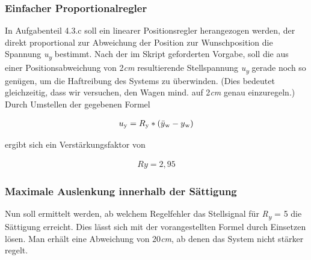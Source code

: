 \documentclass[10pt]{scrartcl}
\begin{document}
\subsubsection {Einfacher Proportionalregler}
In Aufgabenteil 4.3.c soll ein linearer Positionsregler herangezogen werden, der direkt proportional zur Abweichung der Position zur Wunschposition die Spannung \textit{ u\textsubscript{y}} bestimmt.
Nach der im Skript geforderten Vorgabe, soll die aus einer Positionsabweichung von 2\textit{cm} resultierende Stellspannung \textit{ u\textsubscript{y}} gerade noch so genügen, um die Haftreibung des Systems zu überwinden. (Dies bedeutet gleichzeitig, dass wir versuchen, den Wagen mind. auf 2\textit{cm} genau einzuregeln.) 
Durch Umstellen der gegebenen Formel 

\begin {align}
u\textsubscript{y}=R\textsubscript{y}*(\bar{y}\textsubscript{w}-y\textsubscript{w}) 
\end{align}

ergibt sich ein Verstärkungsfaktor von 

\begin {align}
Ry=2,95
\end{align}


\subsubsection {Maximale Auslenkung innerhalb der Sättigung}

Nun soll ermittelt werden, ab welchem Regelfehler das Stellsignal für 
\textit{R\textsubscript{y}} = 5 die Sättigung erreicht. 
Dies lässt sich mit der vorangestellten Formel durch Einsetzen lösen. 
Man erhält eine Abweichung von 20\textit{cm}, ab denen das System nicht stärker regelt.


%

%
%
%
\end{document}
